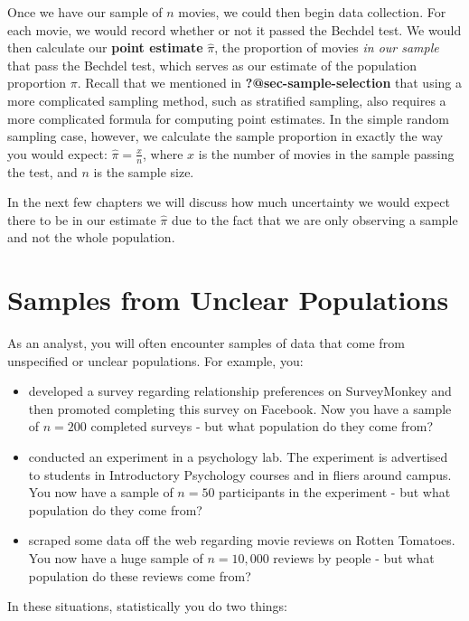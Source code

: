 \documentclass[
  letterpaper,
  DIV=11,
  numbers=noendperiod]{scrreprt}
\providecommand{\tightlist}{%
  \setlength{\itemsep}{0pt}\setlength{\parskip}{0pt}}\usepackage{longtable,booktabs,array}
\theoremstyle{definition}
\theoremstyle{remark}
\begin{document}
Once we have our sample of \(n\) movies, we could then begin data
collection. For each movie, we would record whether or not it passed the
Bechdel test. We would then calculate our \textbf{point estimate}
\(\hat{\pi}\), the proportion of movies \emph{in our sample} that pass
the Bechdel test, which serves as our estimate of the population
proportion \(\pi\). Recall that we mentioned in
\textbf{?@sec-sample-selection} that using a more complicated sampling
method, such as stratified sampling, also requires a more complicated
formula for computing point estimates. In the simple random sampling
case, however, we calculate the sample proportion in exactly the way you
would expect: \(\hat{\pi} = \frac{x}{n}\), where \(x\) is the number of
movies in the sample passing the test, and \(n\) is the sample size.

In the next few chapters we will discuss how much uncertainty we would
expect there to be in our estimate \(\hat{\pi}\) due to the fact that we
are only observing a sample and not the whole population.

\hypertarget{samples}{%
\section{Samples from Unclear Populations}\label{samples}}

As an analyst, you will often encounter samples of data that come from
unspecified or unclear populations. For example, you:

\begin{itemize}
\tightlist
\item
  developed a survey regarding relationship preferences on SurveyMonkey
  and then promoted completing this survey on Facebook. Now you have a
  sample of \(n = 200\) completed surveys - but what population do they
  come from?
\item
  conducted an experiment in a psychology lab. The experiment is
  advertised to students in Introductory Psychology courses and in
  fliers around campus. You now have a sample of \(n = 50\) participants
  in the experiment - but what population do they come from?
\item
  scraped some data off the web regarding movie reviews on Rotten
  Tomatoes. You now have a huge sample of \(n = 10,000\) reviews by
  people - but what population do these reviews come from?
\end{itemize}

In these situations, statistically you do two things:
\end{document}
